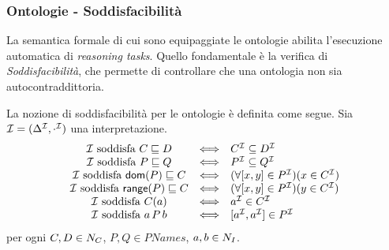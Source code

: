\documentclass[8pt]{beamer}
\begin{document}
\begin{frame}
  \frametitle{Ontologie - Soddisfacibilit\`a}
  
  La semantica formale di cui sono equipaggiate le ontologie
  abilita l'esecuzione automatica di \emph{reasoning tasks}. Quello
  fondamentale \`e la verifica di \emph{Soddisfacibilit\`a}, che 
  permette di controllare che una ontologia non sia autocontraddittoria.
  \vspace{\baselineskip}
  
  La nozione di soddisfacibilit\`a per le ontologie \`e definita come segue.
  Sia $\mathcal{I} = (\Delta^{\mathcal{I}}, \cdot^{\mathcal{I}})$ una interpretazione.   
\[
\begin{array}{ccl}
 \mathcal{I}\mbox{ soddisfa }C \sqsubseteq D & \Longleftrightarrow & C^{\mathcal{I}} \subseteq D^{\mathcal{I}}\\  
 \mathcal{I}\mbox{ soddisfa }P \sqsubseteq Q & \Longleftrightarrow & P^{\mathcal{I}} \subseteq Q^{\mathcal{I}}\\  
 \mathcal{I}\mbox{ soddisfa }\mathsf{dom}(P) \sqsubseteq C & \Longleftrightarrow & (\forall [x,y] \in P^{\mathcal{I}})(x \in C^{\mathcal{I}})\\  
 \mathcal{I}\mbox{ soddisfa }\mathsf{range}(P) \sqsubseteq C & \Longleftrightarrow & (\forall [x,y] \in P^{\mathcal{I}})(y \in C^{\mathcal{I}})\\  
 \mathcal{I}\mbox{ soddisfa }C(a) & \Longleftrightarrow & a^{\mathcal{I}} \in C^{\mathcal{I}}\\  
 \mathcal{I}\mbox{ soddisfa }a\,P\,b & \Longleftrightarrow & [a^{\mathcal{I}}, a^{\mathcal{I}}] \in P^{\mathcal{I}}
\end{array} 
\]
per ogni $C, D \in N_C$, $P, Q \in PNames$, $a,b \in N_I$.
\vspace{\baselineskip}


\end{frame}
\end{document}
